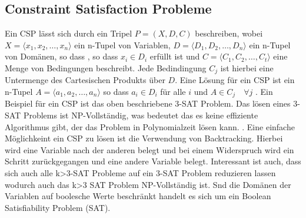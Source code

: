 \subsection{Constraint Satisfaction Probleme}
\label{sec: Constraint Satisfaction Probleme}
Ein CSP lässt sich durch ein Tripel $P=(X,D,C)$ beschreiben, wobei $X=\langle
x_{1},x_{2},\ldots,x_{n}\rangle$  ein n-Tupel von Variablen, $D=\langle
D_{1},D_{2},\ldots,D_{n}\rangle$ ein n-Tupel von Domänen, so dass , so dass
$x_i\in D_{i}$ erfüllt ist und $C=\langle C_1,C_2,\ldots,C_t\rangle$ eine Menge
von Bedingungen beschreibt. Jede Bedindingung $C_j$ ist hierbei eine Untermenge
des Cartesischen Produkts über $D$. Eine Lösung für ein CSP ist ein n-Tupel
$A=\langle a_1,a_2,\ldots,a_n\rangle $ so dass $a_i\in D_i$ für alle $i$ und $A
\in C_j \quad \forall j$ . \cite[16]{rossi06bo} Ein
Beispiel für ein CSP ist das oben beschriebene 3-SAT Problem. Das lösen eines
3-SAT Problems ist NP-Vollständig, was bedeutet das es keine effiziente
Algorithmus gibt, der das Problem in Polynomialzeit lösen kann.
\cite[17]{rossi06bo}. Eine einfache Möglichkeint ein CSP zu lösen ist die
Verwendung von Backtracking. Hierbei wird eine Variable nach der anderen belegt
und bei einem Widerspruch wird ein Schritt zurückgegangen und eine andere
Variable belegt. \cite[21]{rossi06bo} Interessant ist auch, dass  sich auch alle
k>3-SAT Probleme auf ein 3-SAT Problem reduzieren lassen wodurch auch das k>3
SAT Problem NP-Vollständig ist. \cite[206]{gritz13bo} Snd die Domänen der
Variablen auf boolesche Werte beschränkt handelt es sich um ein Boolean
Satisfiability  Problem (SAT).


